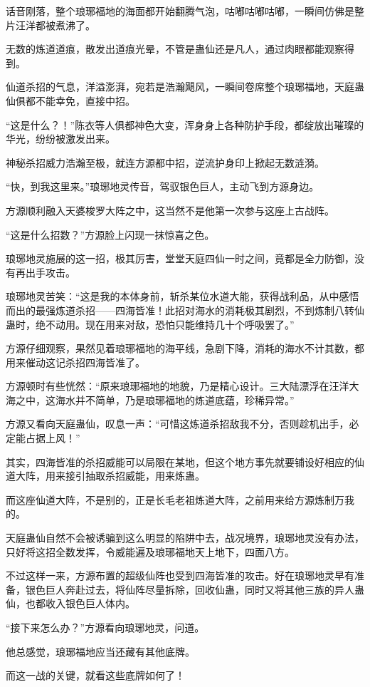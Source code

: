 \begin{this_body}
话音刚落，整个琅琊福地的海面都开始翻腾气泡，咕嘟咕嘟咕嘟，一瞬间仿佛是整片汪洋都被煮沸了。

无数的炼道道痕，散发出道痕光晕，不管是蛊仙还是凡人，通过肉眼都能观察得到。

仙道杀招的气息，洋溢澎湃，宛若是浩瀚飓风，一瞬间卷席整个琅琊福地，天庭蛊仙俱都不能幸免，直接中招。

“这是什么？！”陈衣等人俱都神色大变，浑身身上各种防护手段，都绽放出璀璨的华光，纷纷被激发出来。

神秘杀招威力浩瀚至极，就连方源都中招，逆流护身印上掀起无数涟漪。

“快，到我这里来。”琅琊地灵传音，驾驭银色巨人，主动飞到方源身边。

方源顺利融入天婆梭罗大阵之中，这当然不是他第一次参与这座上古战阵。

“这是什么招数？”方源脸上闪现一抹惊喜之色。

琅琊地灵施展的这一招，极其厉害，堂堂天庭四仙一时之间，竟都是全力防御，没有再出手攻击。

琅琊地灵苦笑：“这是我的本体身前，斩杀某位水道大能，获得战利品，从中感悟而出的最强炼道杀招——四海皆准！此招对海水的消耗极其剧烈，不到炼制八转仙蛊时，绝不动用。现在用来对敌，恐怕只能维持几十个呼吸罢了。”

方源仔细观察，果然见着琅琊福地的海平线，急剧下降，消耗的海水不计其数，都用来催动这记杀招四海皆准了。

方源顿时有些恍然：“原来琅琊福地的地貌，乃是精心设计。三大陆漂浮在汪洋大海之中，这海水并不简单，乃是琅琊福地的炼道底蕴，珍稀异常。”

方源又看向天庭蛊仙，叹息一声：“可惜这炼道杀招敌我不分，否则趁机出手，必定能占据上风！”

其实，四海皆准的杀招威能可以局限在某地，但这个地方事先就要铺设好相应的仙道大阵，用来接引抽取杀招威能，用来炼蛊。

而这座仙道大阵，不是别的，正是长毛老祖炼道大阵，之前用来给方源炼制万我的。

天庭蛊仙自然不会被诱骗到这么明显的陷阱中去，战况境界，琅琊地灵没有办法，只好将这招全数发挥，令威能遍及琅琊福地天上地下，四面八方。

不过这样一来，方源布置的超级仙阵也受到四海皆准的攻击。好在琅琊地灵早有准备，银色巨人奔赴过去，将仙阵尽量拆除，回收仙蛊，同时又将其他三族的异人蛊仙，也都收入银色巨人体内。

“接下来怎么办？”方源看向琅琊地灵，问道。

他总感觉，琅琊福地应当还藏有其他底牌。

而这一战的关键，就看这些底牌如何了！

\end{this_body}

